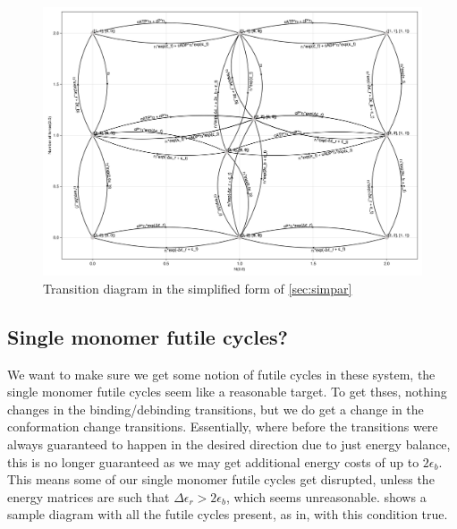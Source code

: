 \documentclass[11pt]{article}
\begin{document}
\begin{figure}[H]
    \includegraphics[width=\textwidth]{../../plots/simple_sg_B=1_C=2_N=2_version=2.5.png}
    \caption{
        Transition diagram in the simplified form of \cref{sec:simpar}
    }\label{fig:N2trans}
\end{figure}

\subsection{Single monomer futile cycles?}
We want to make sure we get some notion of futile cycles in these system, the single monomer futile cycles seem like a reasonable target.
To get thses, nothing changes in the binding/debinding transitions, but we do get a change in the conformation change transitions.
Essentially, where before the transitions were always guaranteed to happen in the desired direction due to just energy balance, this is no longer guaranteed as we may get additional energy costs of up to $2\epsilon_b$.
This means some of our single monomer futile cycles get disrupted, unless the energy matrices are such that $\Delta\epsilon_r > 2\epsilon_b$, which seems unreasonable.
 shows a sample diagram with all the futile cycles present, as in, with this condition true.
\end{document}
